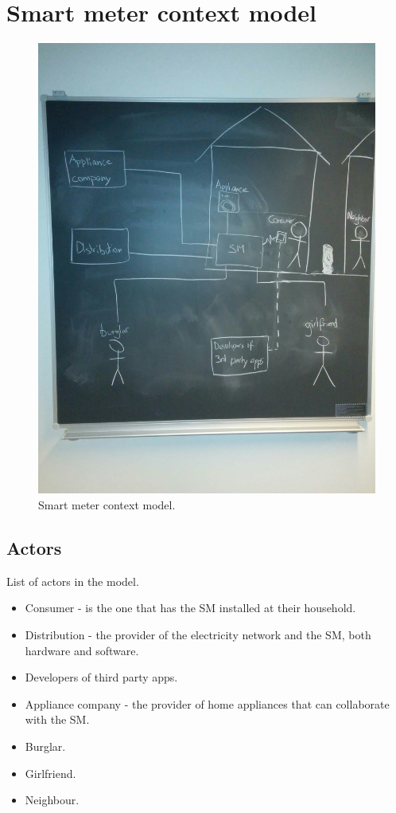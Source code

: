 \section{Smart meter context model}
\begin{figure}
  \includegraphics[width=\textwidth]{figures/situation.jpg}
  \caption{Smart meter context model.}
  \label{sm_model}
\end{figure}

\subsection{Actors}
List of actors in the model.
\begin{itemize}
\item Consumer - is the one that has the SM installed at their household.
\item Distribution - the provider of the electricity network and the SM, both hardware and software.
\item Developers of third party apps.
\item Appliance company - the provider of home appliances that can collaborate with the SM.
\item Burglar.
\item Girlfriend.
\item Neighbour.
\end{itemize}

